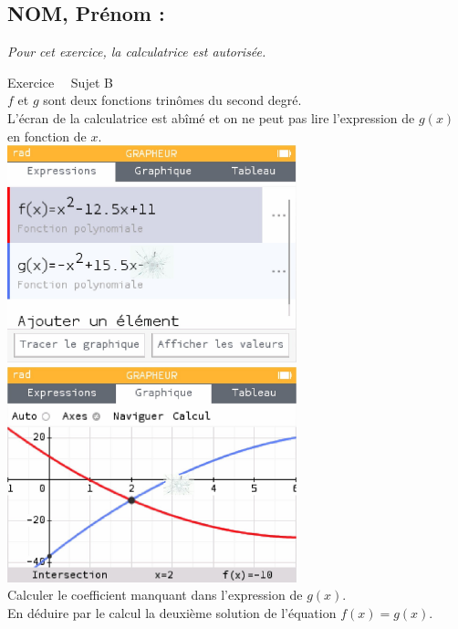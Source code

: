 \documentclass[a4paper,11pt,eval]{nsi}
\newcounter{exoNum}
\newcommand{\exo}[1]
{
	\addtocounter{exoNum}{1}
	{\titlefont\color{UGLiBlue}\Large Exercice\ \theexoNum\ \normalsize{#1}}\smallskip	
}
\begin{document}
\subsection*{NOM, Prénom : \dotfill} 
\textit{Pour cet exercice, la calculatrice est autorisée.}\\

\exo{ Sujet B}\\
$f$ et $g$ sont deux fonctions trinômes du second degré.\\
L'écran de la calculatrice est abîmé et on ne peut pas lire l'expression de $g(x)$ en fonction de $x$.\\[.5em]
\includegraphics[width=8.4cm]{calculatriceB1bis.jpg}
\includegraphics[width=8.4cm]{calculatriceB2bis.jpg}\\[.5em]
Calculer le coefficient manquant dans l'expression de $g(x)$.\\
En déduire par le calcul la deuxième solution de l'équation $f(x)=g(x)$.\\[.5em]
\\
\end{document}
